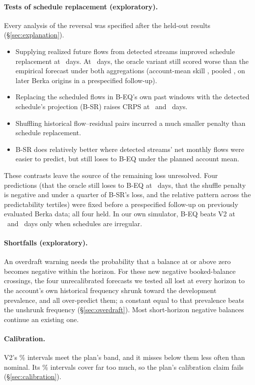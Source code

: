 \paragraph{Tests of schedule replacement (exploratory).} Every analysis of
the reversal was specified after the held-out results
(\S\ref{sec:explanation}).
\begin{itemize}
\item Supplying realized future flows from detected streams improved
  schedule replacement at \hB\ days. At \hC\ days, the oracle variant
  still scored worse than the empirical forecast under both aggregations
  (account-mean skill , pooled
  , on later Berka origins in a
  prespecified follow-up).
\item Replacing the scheduled flows in B-EQ's own past windows with the
  detected schedule's projection (B-SR) raises CRPS at \hB\ and \hC\ days.
\item Shuffling historical flow--residual pairs incurred a much smaller
  penalty than schedule replacement.
\item B-SR does relatively better where detected streams' net monthly
  flows were easier to predict, but still loses to B-EQ under the planned
  account mean.
\end{itemize}
These contrasts leave the source of the remaining loss unresolved. Four
predictions (that the oracle still loses to B-EQ at \hC\ days, that the
shuffle penalty is negative and under a quarter of B-SR's loss, and the
relative pattern across the predictability tertiles) were fixed before a prespecified
follow-up on previously evaluated Berka data; all four held. In our own
simulator, B-EQ beats V2 at \hB\ and \hC\ days only when schedules are
irregular.

\paragraph{Shortfalls (exploratory).} An overdraft warning needs the
probability that a balance at or above zero becomes negative within the
horizon. For these new negative booked-balance crossings, the four
unrecalibrated forecasts we tested all lost at every horizon to the
account's own historical frequency shrunk toward the development
prevalence, and all over-predict them; a constant equal to that
prevalence beats the unshrunk frequency (\S\ref{sec:overdraft}). Most
short-horizon negative balances continue an existing one.

\paragraph{Calibration.} V2's \lC\% intervals meet the plan's band, and it
misses below them less often than nominal. Its \lA\% intervals cover far
too much, so the plan's calibration claim fails (\S\ref{sec:calibration}).

